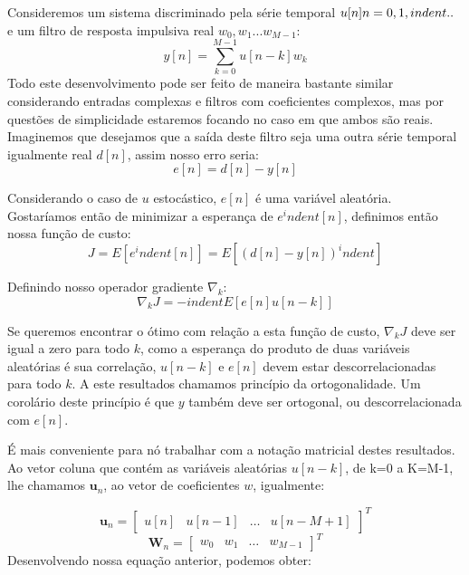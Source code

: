 \documentclass[a4paper, 12pt]{book}
\begin{document}
Consideremos um sistema discriminado pela série temporal $u[n] \space n=0,1,indent..$ e um filtro de resposta impulsiva real $w_0, w_1 ... w_{M-1}$:
\begin{equation}
    y[n]=\sum_{k=0}^{M-1}u[n-k]w_k
\end{equation}
Todo este desenvolvimento pode ser feito de maneira bastante similar considerando entradas complexas e filtros com coeficientes complexos, mas por questões de simplicidade estaremos focando no caso em que ambos são reais. Imaginemos que desejamos que a saída deste filtro seja uma outra série temporal igualmente real $d[n]$, assim nosso erro seria:
\begin{equation}
    e[n]=d[n]-y[n]    
\end{equation}

Considerando o caso de $u$ estocástico, $e[n]$ é uma variável aleatória. Gostaríamos então de minimizar a esperança de $e^indent[n]$, definimos então nossa função de custo:
\begin{equation}
    J=E[e^indent[n]]=E[(d[n]-y[n])^indent]   
\end{equation}

Definindo nosso operador gradiente $\nabla_k$:
\begin{equation}
    \nabla_k J=-indent E[e[n]u[n-k]]   
\end{equation}

Se queremos encontrar o ótimo com relação a esta função de custo, $\nabla_k J$ deve ser igual a zero para todo $k$, como a esperança do produto de duas variáveis aleatórias é sua correlação, $u[n-k]$ e $e[n]$ devem estar descorrelacionadas para todo $k$. A este resultados chamamos princípio da ortogonalidade. Um corolário deste princípio é que $y$ também deve ser ortogonal, ou descorrelacionada com $e[n]$.

\indent É mais conveniente para nó trabalhar com a notação matricial destes resultados. Ao vetor coluna que contém as variáveis aleatórias $u[n-k]$, de k=0 a K=M-1, lhe chamamos $\boldsymbol{u}_n$, ao vetor de coeficientes $w$, igualmente:

\begin{equation*}
    \boldsymbol{u}_n=
    \begin{bmatrix}
        u[n] & u[n-1] & \dots & u[n-M+1]
    \end{bmatrix}^T
\end{equation*}
\begin{equation*}
    \boldsymbol{W}_n=
    \begin{bmatrix}
        w_0 & w_1 & \dots & w_{M-1}
    \end{bmatrix}^T
\end{equation*}
Desenvolvendo nossa equação anterior, podemos obter:
\end{document}
